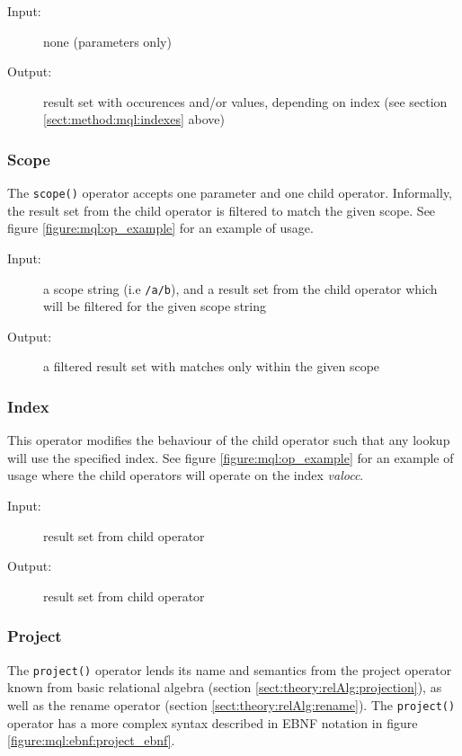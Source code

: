 \begin{description}
  \item[Input:] none (parameters only)
  \item[Output:] result set with occurences and/or values, depending on index
(see section \ref{sect:method:mql:indexes} above)
\end{description}

\subsubsection{Scope}
\label{sect:method:marsOperators:scope}
The \texttt{scope()} operator accepts one parameter and one child operator. Informally, the
result set from the child operator is filtered to match the given scope. See
figure \ref{figure:mql:op_example} for an example of usage.

\begin{description}
  \item[Input:] a scope string (i.e \texttt{/a/b}), and a result set from the
child operator which will be filtered for the given scope string
  \item[Output:] a filtered result set with matches only within the given scope
\end{description}

\subsubsection{Index}
\label{sect:method:marsOperators:index}
This operator modifies the behaviour of the child operator such that any lookup
will use the specified index. See figure \ref{figure:mql:op_example} for an
example of usage where the child operators will operate on the index
\textit{valocc}.

\begin{description}
  \item[Input:] result set from child operator
  \item[Output:] result set from child operator
\end{description}

\subsubsection{Project}
\label{sect:method:marsOperators:project}
The \texttt{project()} operator lends its name and semantics from the project operator known from basic relational
algebra (section \ref{sect:theory:relAlg:projection}), as well as the rename operator (section
\ref{sect:theory:relAlg:rename}). The \texttt{project()} operator has a more complex syntax described in EBNF
notation in figure \ref{figure:mql:ebnf:project_ebnf}.

